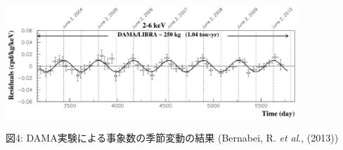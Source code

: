 \documentclass[10pt,a4paper,twoside]{jarticle}
\newcommand{\研究課題名}{XMASS検出器を用いた季節変動による暗黒物質の直接探索}
\newcommand{\研究機関名}{神戸大学}
\newcommand{\申請者氏名}{岡直哉}
\newcommand{\研究代表者氏名}{\申請者氏名}
\newcommand{\研究期間の最終元号年度}{29}	%
\begin{document}
{%
\def\damasize{11cm}


%
		         \includegraphics[width=\damasize]{dama.pdf}
         		\begin{center}
図4: DAMA実験による事象数の季節変動の結果 (Bernabei, R. \textit{et al}., (2013))
	         \end{center}




}

\end{document}

